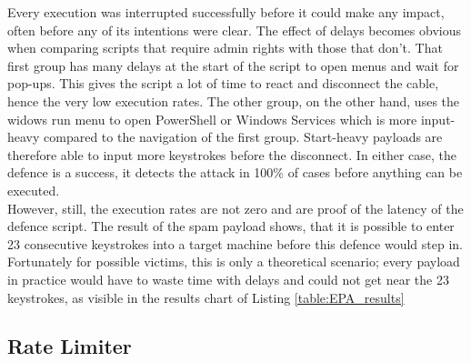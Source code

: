 Every execution was interrupted successfully before it could make any impact, often before any of its intentions were clear. The effect of delays becomes obvious when comparing scripts that require admin rights with those that don't. That first group has many delays at the start of the script to open menus and wait for pop-ups. This gives the script a lot of time to react and disconnect the cable, hence the very low execution rates. The other group, on the other hand, uses the widows run menu to open PowerShell or Windows Services which is more input-heavy compared to the navigation of the first group. Start-heavy payloads are therefore able to input more keystrokes before the disconnect. In either case, the defence is a success, it detects the attack in 100\% of cases before anything can be executed. \\
However, still, the execution rates are not zero and are proof of the latency of the defence script. The result of the spam payload shows, that it is possible to enter 23 consecutive keystrokes into a target machine before this defence would step in. Fortunately for possible victims, this is only a theoretical scenario; every payload in practice would have to waste time with delays and could not get near the 23 keystrokes, as visible in the results chart of Listing \ref{table:EPA_results}\


\subsection{Rate Limiter}

